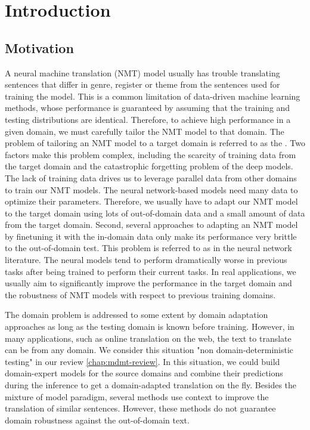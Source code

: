 \chapter{Introduction}
\section{Motivation}
A neural machine translation (NMT) model usually has trouble translating sentences that differ in genre, register or theme from the sentences used for training the model. This is a common limitation of data-driven machine learning methods, whose performance is guaranteed by assuming that the training and testing distributions are identical. Therefore, to achieve high performance in a given domain, we must carefully tailor the NMT model to that domain. The problem of tailoring an NMT model to a target domain is referred to as the . Two factors make this problem complex, including the scarcity of training data from the target domain and the catastrophic forgetting problem of the deep models. The lack of training data drives us to leverage parallel data from other domains to train our NMT models. The neural network-based models need many data to optimize their parameters. Therefore, we usually have to adapt our NMT model to the target domain using lots of out-of-domain data and a small amount of data from the target domain. Second, several approaches to adapting an NMT model by finetuning it with the in-domain data only make its performance very brittle to the out-of-domain test. This problem is referred to as  in the neural network literature. The neural models tend to perform dramatically worse in previous tasks after being trained to perform their current tasks. In real applications, we usually aim to significantly improve the performance in the target domain and the robustness of NMT models with respect to previous training domains.

The domain problem is addressed to some extent by domain adaptation approaches as long as the testing domain is known before training. However, in many applications, such as online translation on the web, the text to translate can be from any domain. We consider this situation "non domain-deterministic testing" in our review \ref{chap:mdmt-review}. In this situation, we could build domain-expert models for the source domains and combine their predictions during the inference \citep{Saunders19domain} to get a domain-adapted translation on the fly. Besides the mixture of model paradigm, several methods use context to improve the translation of similar sentences. However, these methods do not guarantee domain robustness against the out-of-domain text.

